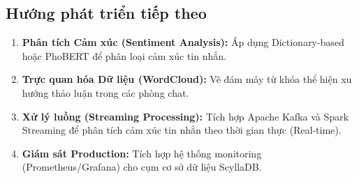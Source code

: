 \documentclass[12pt,a4paper]{article}
\begin{document}
\subsection{Hướng phát triển tiếp theo}

\begin{enumerate}[noitemsep]
    \item \textbf{Phân tích Cảm xúc (Sentiment Analysis):} Áp dụng Dictionary-based hoặc PhoBERT để phân loại cảm xúc tin nhắn.
    \item \textbf{Trực quan hóa Dữ liệu (WordCloud):} Vẽ đám mây từ khóa thể hiện xu hướng thảo luận trong các phòng chat.
    \item \textbf{Xử lý luồng (Streaming Processing):} Tích hợp Apache Kafka và Spark Streaming để phân tích cảm xúc tin nhắn theo thời gian thực (Real-time).
    \item \textbf{Giám sát Production:} Tích hợp hệ thống monitoring (Prometheus/Grafana) cho cụm cơ sở dữ liệu ScyllaDB.
\end{enumerate}
\end{document}
